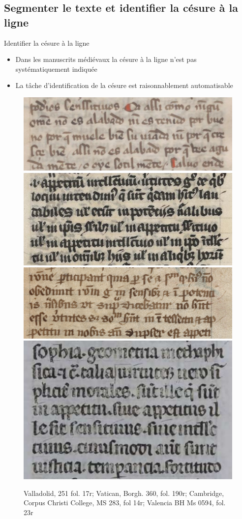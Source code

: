 \documentclass[11pt,aspectratio=169]{beamer}
\begin{document}
\subsection{Segmenter le texte et identifier la césure à la ligne}
\begin{frame}{Identifier la césure à la ligne}
\begin{center}
\begin{itemize}
\item Dans les manuscrits médiévaux la césure à la ligne n'est pas systématiquement indiquée
\item La tâche d'identification de la césure est raisonnablement automatisable
\end{itemize}
\begin{figure}
\includegraphics[width=.35\textwidth]{img/Valladolid_251_17r.png}
\includegraphics[width=.27\textwidth]{img/Borgh_360_190r.png}
\includegraphics[width=.35\textwidth]{img/CCC_MSS_283_14r.png}
\includegraphics[width=.27\textwidth]{img/Valencia_BH-Ms-0594_23r.png}
\caption{Valladolid, 251 fol. 17r; Vatican, Borgh. 360, fol. 190r; Cambridge, Corpus Christi College, MS 283, fol 14r; Valencia BH Ms 0594, fol. 23r}
\end{figure}
\end{center}
\end{frame}
\end{document}
